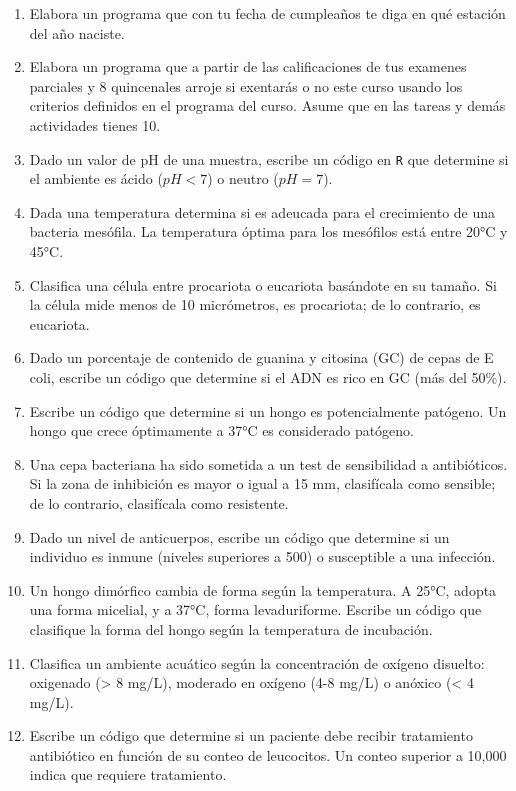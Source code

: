 \documentclass[
]{book}
\begin{document}
\begin{enumerate}
\def\labelenumi{\arabic{enumi}.}
\item
  Elabora un programa que con tu fecha de cumpleaños te diga en qué estación del año naciste.
\item
  Elabora un programa que a partir de las calificaciones de tus examenes parciales y 8 quincenales arroje si exentarás o no este curso usando los criterios definidos en el programa del curso. Asume que en las tareas y demás actividades tienes 10.
\item
  Dado un valor de pH de una muestra, escribe un código en \texttt{R} que determine si el ambiente es ácido (\(pH < 7\)) o neutro (\(pH = 7\)).
\item
  Dada una temperatura determina si es adeucada para el crecimiento de una bacteria mesófila. La temperatura óptima para los mesófilos está entre 20°C y 45°C.
\item
  Clasifica una célula entre procariota o eucariota basándote en su tamaño. Si la célula mide menos de 10 micrómetros, es procariota; de lo contrario, es eucariota.
\item
  Dado un porcentaje de contenido de guanina y citosina (GC) de cepas de E coli, escribe un código que determine si el ADN es rico en GC (más del 50\%).
\item
  Escribe un código que determine si un hongo es potencialmente patógeno. Un hongo que crece óptimamente a 37°C es considerado patógeno.
\item
  Una cepa bacteriana ha sido sometida a un test de sensibilidad a antibióticos. Si la zona de inhibición es mayor o igual a 15 mm, clasifícala como sensible; de lo contrario, clasifícala como resistente.
\item
  Dado un nivel de anticuerpos, escribe un código que determine si un individuo es inmune (niveles superiores a 500) o susceptible a una infección.
\item
  Un hongo dimórfico cambia de forma según la temperatura. A 25°C, adopta una forma micelial, y a 37°C, forma levaduriforme. Escribe un código que clasifique la forma del hongo según la temperatura de incubación.
\item
  Clasifica un ambiente acuático según la concentración de oxígeno disuelto: oxigenado (\textgreater{} 8 mg/L), moderado en oxígeno (4-8 mg/L) o anóxico (\textless{} 4 mg/L).
\item
  Escribe un código que determine si un paciente debe recibir tratamiento antibiótico en función de su conteo de leucocitos. Un conteo superior a 10,000 indica que requiere tratamiento.

\end{enumerate}
\end{document}
